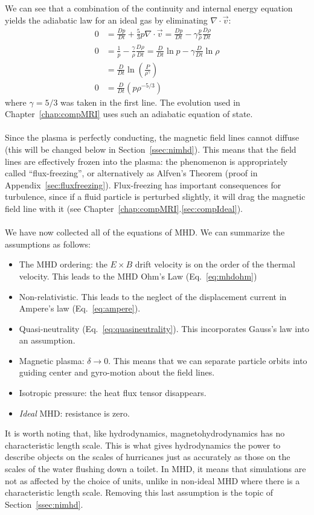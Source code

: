 We can see that a combination of the continuity and internal energy equation yields the adiabatic law for an ideal gas by eliminating $\nabla\cdot\vec v$:
\begin{align}
  0&=\frac{Dp}{Dt}+\frac53p\nabla\cdot\vec v=\frac{Dp}{Dt}-\gamma\frac p\rho\frac{D\rho}{Dt}\nonumber\\
  0&=\frac1p-\frac\gamma\rho\frac{D\rho}{Dt}=\frac{D}{Dt}\ln p-\gamma\frac{D}{Dt}\ln\rho\nonumber\\
  &=\frac{D}{Dt}\ln\left(\frac{P}{\rho^\gamma}\right)\nonumber\\
  0&=\frac{D}{Dt}\left(p\rho^{-5/3}\right)\label{eq:adiabaticgas}
\end{align}
where $\gamma=5/3$ was taken in the first line. The evolution used in Chapter~\ref{chap:compMRI} uses such an adiabatic equation of state.\\
\\
Since the plasma is perfectly conducting, the magnetic field lines cannot diffuse (this will be changed below in Section~\ref{ssec:nimhd}). This means that the field lines are effectively frozen into the plasma: the phenomenon is appropriately called ``flux-freezing'', or alternatively as Alfven's Theorem (proof in Appendix~\ref{sec:fluxfreezing}). Flux-freezing has important consequences for turbulence, since if a fluid particle is perturbed slightly, it will drag the magnetic field line with it (see Chapter~\ref{chap:compMRI}.\ref{sec:compIdeal}).\\
\\
We have now collected all of the equations of MHD. We can summarize the assumptions as follows:
\begin{itemize}
  \item The MHD ordering: the $E\times B$ drift velocity is on the order of the thermal velocity. This leads to the MHD Ohm's Law (Eq.~\ref{eq:mhdohm}) 
  \item Non-relativistic. This leads to the neglect of the displacement current in Ampere's law (Eq.~\ref{eq:ampere}).
  \item Quasi-neutrality (Eq.~\ref{eq:quasineutrality}). This incorporates Gauss's law into an assumption.
  \item Magnetic plasma: $\delta\to0$. This means that we can separate particle orbits into guiding center and gyro-motion about the field lines.
  \item Isotropic pressure: the heat flux tensor disappears.
  \item \textit{Ideal} MHD: resistance is zero.
\end{itemize}
It is worth noting that, like hydrodynamics, magnetohydrodynamics has no characteristic length scale. This is what gives hydrodynamics the power to describe objects on the scales of hurricanes just as accurately as those on the scales of the water flushing down a toilet. In MHD, it means that simulations are not as affected by the choice of units, unlike in non-ideal MHD where there is a characteristic length scale. Removing this last assumption is the topic of Section~\ref{ssec:nimhd}.

